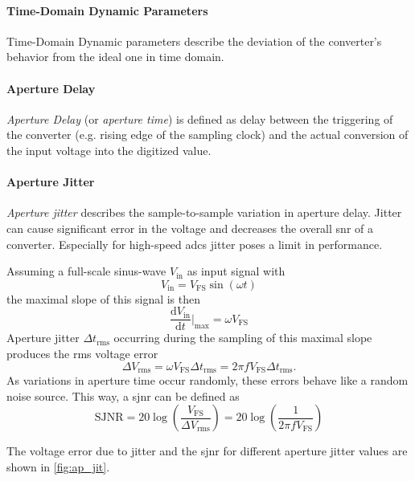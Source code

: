 \paragraph{Time-Domain Dynamic Parameters}
Time-Domain Dynamic parameters describe the deviation of the converter's behavior from the ideal one in time domain. 

\paragraph{Aperture Delay}
\textit{Aperture Delay} (or \textit{aperture time}) is defined as delay between the triggering of the converter (e.g. rising edge of the sampling clock) and the actual conversion of the input voltage into the digitized value. \cite{Lundberg}

\paragraph{Aperture Jitter}
\textit{Aperture jitter} describes the sample-to-sample variation in aperture delay. Jitter can cause significant error in the voltage and decreases the overall \gls{snr} of a converter.
Especially for high-speed \glspl{adc} jitter poses a limit in performance.

Assuming a full-scale sinus-wave $V_{\text{in}}$ as input signal with 
\begin{equation}
	V_{\text{in}} = V_{\text{FS}} \sin(\omega t)
\end{equation}
the maximal slope of this signal is then
\begin{equation}
	\frac{\text{d}V_{\text{in}}}{\text{d}t}\Bigr|_{\text{max}} = \omega V_{\text{FS}}
\end{equation}
Aperture jitter $\Delta t_{\text{rms}}$ occurring during the sampling of this maximal slope produces the \gls{rms} voltage error 
\begin{equation}
	\Delta V_{\text{rms}} = \omega  V_{\text{FS}} \Delta t_{\text{rms}} = 2 \pi f  V_{\text{FS}} \Delta t_{\text{rms}}.
\end{equation}
As variations in aperture time occur randomly, these errors behave like a random noise source. This way, a \gls{sjnr} can be defined as
\begin{equation}
	\text{SJNR} = 20 \log \left( \frac{V_{\text{FS}}}{\Delta V_{\text{rms}}} \right) = 20 \log \left( \frac{1}{2 \pi f  V_{\text{FS}}} \right)
\end{equation}

The voltage error due to jitter and the \gls{sjnr} for different aperture jitter values are shown in \autoref{fig:ap_jit}.

